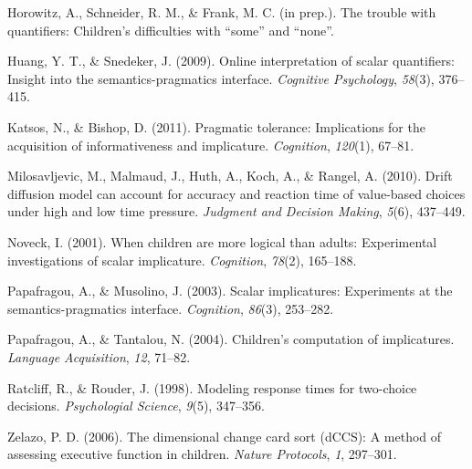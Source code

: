 \documentclass[10pt, letterpaper]{article}
\begin{document}
Horowitz, A., Schneider, R. M., \& Frank, M. C. (in prep.). The trouble
with quantifiers: Children's difficulties with ``some'' and ``none''.

Huang, Y. T., \& Snedeker, J. (2009). Online interpretation of scalar
quantifiers: Insight into the semantics-pragmatics interface.
\emph{Cognitive Psychology}, \emph{58}(3), 376--415.

Katsos, N., \& Bishop, D. (2011). Pragmatic tolerance: Implications for
the acquisition of informativeness and implicature. \emph{Cognition},
\emph{120}(1), 67--81.

Milosavljevic, M., Malmaud, J., Huth, A., Koch, A., \& Rangel, A.
(2010). Drift diffusion model can account for accuracy and reaction time
of value-based choices under high and low time pressure. \emph{Judgment
and Decision Making}, \emph{5}(6), 437--449.

Noveck, I. (2001). When children are more logical than adults:
Experimental investigations of scalar implicature. \emph{Cognition},
\emph{78}(2), 165--188.

Papafragou, A., \& Musolino, J. (2003). Scalar implicatures: Experiments
at the semantics-pragmatics interface. \emph{Cognition}, \emph{86}(3),
253--282.

Papafragou, A., \& Tantalou, N. (2004). Children's computation of
implicatures. \emph{Language Acquisition}, \emph{12}, 71--82.

Ratcliff, R., \& Rouder, J. (1998). Modeling response times for
two-choice decisions. \emph{Psychologial Science}, \emph{9}(5),
347--356.

Zelazo, P. D. (2006). The dimensional change card sort (dCCS): A method
of assessing executive function in children. \emph{Nature Protocols},
\emph{1}, 297--301.
\end{document}
